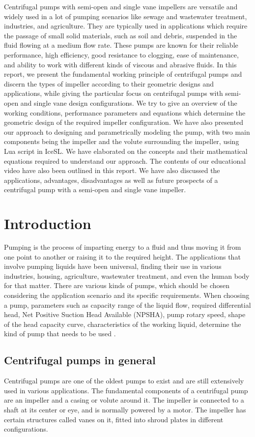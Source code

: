 \documentclass[11pt,a4paper]{scrartcl}
\begin{document}
Centrifugal pumps with semi-open and single vane impellers are versatile and widely used in a lot of pumping scenarios like sewage and wastewater treatment, industries, and agriculture. They are typically used in applications which require the passage of small solid materials, such as soil and debris, suspended in the fluid flowing at a medium flow rate. These pumps are known for their reliable performance, high efficiency, good resistance to clogging, ease of maintenance, and ability to work with different kinds of viscous and abrasive fluids. In this report, we present the fundamental working principle of centrifugal pumps and discern the types of impeller according to their geometric designs and applications, while giving the particular focus on centrifugal pumps with semi-open and single vane design configurations. We try to give an overview of the working conditions, performance parameters and equations which determine the geometric design of the required impeller configuration. We have also presented our approach to designing and parametrically modeling the pump, with two main components being the impeller and the volute surrounding the impeller, using Lua script in IceSL. We have elaborated on the concepts and their mathematical equations required to understand our approach. The contents of our educational video have also been outlined in this report. We have also discussed the applications, advantages, disadvantages as well as future prospects of a centrifugal pump with a semi-open and single vane impeller.

\section{Introduction}
Pumping is the process of imparting energy to a fluid and thus moving it from one point to another or raising it to the required height. The applications that involve pumping liquids have been universal, finding their use in various industries, housing, agriculture, wastewater treatment, and even the human body for that matter. There are various kinds of pumps,  which should be chosen considering  the application scenario and its specific requirements. When choosing a pump, parameters such as capacity range of the liquid flow, required differential head, Net Positive Suction Head Available (NPSHA), pump rotary speed, shape of the head capacity curve, characteristics of the working liquid, determine the kind of pump that needs to be used \cite{lobanoff}.

\subsection{Centrifugal pumps in general}
Centrifugal pumps are one of the oldest pumps to exist and are still extensively used in various applications. The fundamental components of a centrifugal pump are an impeller and a casing or volute around it. The impeller is connected to a shaft at its center or eye, and is normally powered by a motor. The impeller has certain structures called vanes on it, fitted into shroud plates in different configurations.\par
\end{document}
